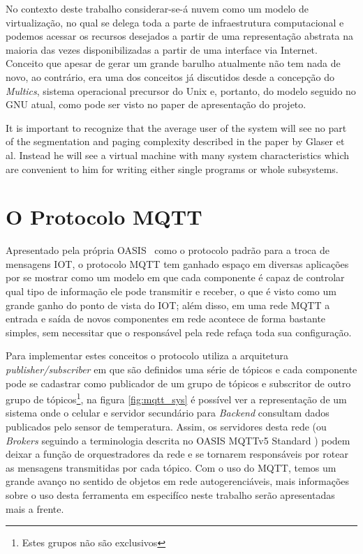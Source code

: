 No contexto deste trabalho considerar-se-á nuvem como um modelo de virtualização, no qual se delega toda a parte de 
infraestrutura computacional e podemos acessar os recursos desejados a partir de uma representação abstrata na maioria 
das vezes disponibilizadas a partir de uma interface via Internet. Conceito que apesar de gerar um grande barulho atualmente
não tem nada de novo, ao contrário, era uma dos conceitos já discutidos desde a concepção do \textit{Multics}, sistema 
operacional precursor do Unix e, portanto, do modelo seguido no GNU atual, como pode ser visto no paper de apresentação 
do projeto.

\begin{citacao}
It is important to recognize that the average user of the system will see no part of the segmentation and paging 
complexity described in the paper by Glaser et al. Instead he will see a virtual machine with many system characteristics 
which are convenient to him for writing either single programs or whole subsystems. \cite{multics-paper}
\end{citacao}

\section{O Protocolo MQTT}

Apresentado pela própria OASIS\textregistered~ como o protocolo padrão para a troca de mensagens \ac{IOT}, o protocolo \ac{MQTT}
tem ganhado espaço em diversas aplicações por se mostrar como um modelo em que cada componente é capaz de controlar qual
tipo de informação ele pode transmitir e receber, o que é visto como um grande ganho do ponto de vista do \ac{IOT}; além 
disso, em uma rede \ac{MQTT} a entrada e saída de novos componentes em rede acontece de forma bastante simples, sem 
necessitar que o responsável pela rede refaça toda sua configuração.

Para implementar estes conceitos o protocolo utiliza a arquitetura \textit{publisher/subscriber} em que são definidos
uma série de tópicos e cada componente pode se cadastrar como publicador de um grupo de tópicos e subscritor de outro 
grupo de tópicos\footnote{Estes grupos não são exclusivos}, na figura \autoref{fig:mqtt_sys} é possível ver a representação de um 
sistema onde o celular e servidor secundário para \textit{Backend} consultam dados publicados pelo sensor de temperatura. 
Assim, os servidores desta rede (ou \textit{Brokers} seguindo a terminologia
descrita no OASIS MQTTv5 Standard \cite{mqtt-std}) podem deixar a função de orquestradores da rede e se tornarem responsáveis
por rotear as mensagens transmitidas por cada tópico. Com o uso do \ac{MQTT}, temos um grande avanço no sentido de objetos
em rede autogerenciáveis, mais informações sobre o uso desta ferramenta em especifíco neste trabalho serão apresentadas 
mais a frente.

